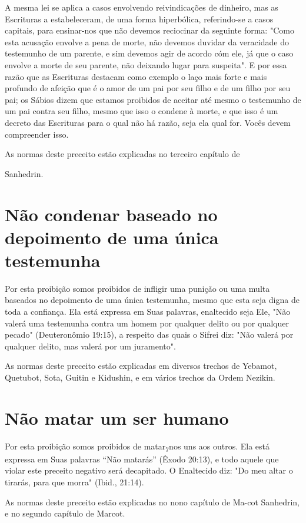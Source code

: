 A mesma lei se aplica a casos envolvendo reivindicações de dinhei­ro,
mas as Escrituras a estabeleceram, de uma forma hiperbólica,
referindo-se a casos capitais, para ensinar-nos que não devemos
reciocinar da seguinte for­ma: "Como esta acusação envolve a pena de
morte, não devemos duvidar da veracidade do testemunho de um parente, e
sim devemos agir de acordo cóm ele, já que o caso envolve a morte de seu
parente, não deixando lugar para sus­peita". E por essa razão que as
Escrituras destacam como exemplo o laço mais forte e mais profundo de
afeição que é o amor de um pai por seu filho e de um filho por seu pai;
os Sábios dizem que estamos proibidos de aceitar até mes­mo o testemunho
de um pai contra seu filho, mesmo que isso o condene à morte, e que isso
é um decreto das Escrituras para o qual não há razão, seja ela qual for.
Vocês devem compreender isso.


As normas deste preceito estão explicadas no terceiro capítulo de


Sanhedrin.

\section{Não condenar baseado no depoimento de uma única testemunha}

Por esta proibição somos proibidos de infligir uma punição ou uma multa
baseados no depoimento de uma única testemunha, mesmo que esta seja
digna de toda a confiança. Ela está expressa em Suas palavras,
enaltecido seja Ele, "Não valerá uma testemunha contra um homem por
qualquer delito ou por qualquer pecado" (Deuteronômio 19:15), a respeito
das quais o Sifrei diz: "Não valerá por qualquer delito, mas valerá por
um juramento".

As normas deste preceito estão explicadas em diversos trechos de
Yebamot, Quetubot, Sota, Guitin e Kidushin, e em vários trechos da Ordem
Nezikin.

\section{Não matar um ser humano}

Por esta proibição somos proibidos de matar\textsubscript{7}nos uns aos
outros. Ela está expressa em Suas palavras ``Não matarás'' (Êxodo 20:13),
e todo aquele que violar este preceito negativo será decapitado. O
Enaltecido diz: "Do meu altar o tirarás, para que morra" (Ibid., 21:14).

As normas deste preceito estão explicadas no nono capítulo de Ma-cot
Sanhedrin, e no segundo capítulo de Marcot.


